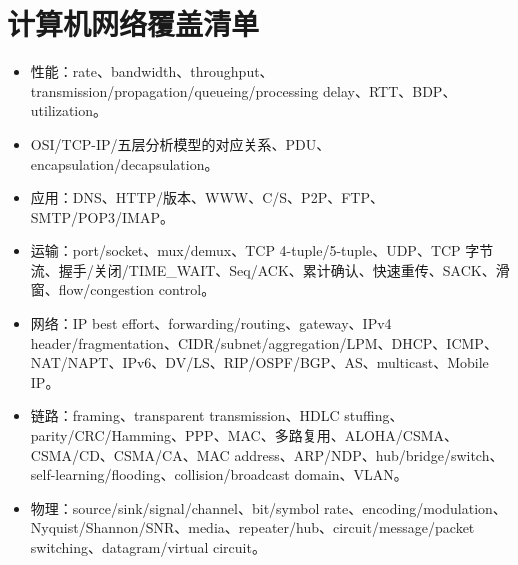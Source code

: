 \documentclass[11pt,a4paper,openany]{ctexbook}
\begin{document}
\section{计算机网络覆盖清单}
\begin{itemize}
  \item 性能：rate、bandwidth、throughput、transmission/propagation/queueing/processing delay、RTT、BDP、utilization。
  \item OSI/TCP-IP/五层分析模型的对应关系、PDU、encapsulation/decapsulation。
  \item 应用：DNS、HTTP/版本、WWW、C/S、P2P、FTP、SMTP/POP3/IMAP。
  \item 运输：port/socket、mux/demux、TCP 4-tuple/5-tuple、UDP、TCP 字节流、握手/关闭/TIME\_WAIT、Seq/ACK、累计确认、快速重传、SACK、滑窗、flow/congestion control。
  \item 网络：IP best effort、forwarding/routing、gateway、IPv4 header/fragmentation、CIDR/subnet/aggregation/LPM、DHCP、ICMP、NAT/NAPT、IPv6、DV/LS、RIP/OSPF/BGP、AS、multicast、Mobile IP。
  \item 链路：framing、transparent transmission、HDLC stuffing、parity/CRC/Hamming、PPP、MAC、多路复用、ALOHA/CSMA、CSMA/CD、CSMA/CA、MAC address、ARP/NDP、hub/bridge/switch、self-learning/flooding、collision/broadcast domain、VLAN。
  \item 物理：source/sink/signal/channel、bit/symbol rate、encoding/modulation、Nyquist/Shannon/SNR、media、repeater/hub、circuit/message/packet switching、datagram/virtual circuit。
\end{itemize}
\end{document}
